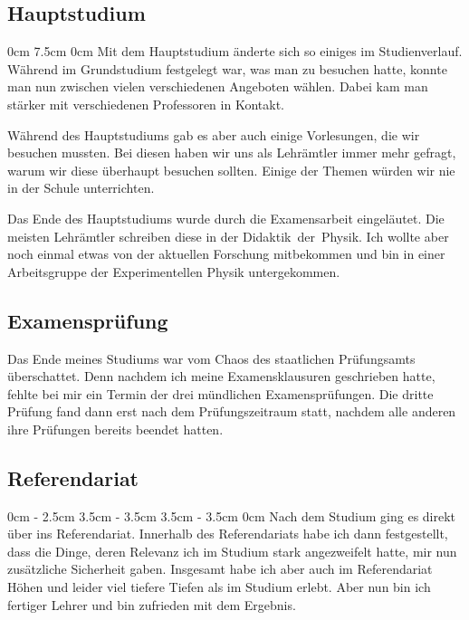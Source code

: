 \begin{multicols*}{2}

\subsection*{Hauptstudium}
0cm 7.5cm
0cm \columnwidth
Mit dem Hauptstudium änderte sich so einiges im Studienverlauf. Während im Grundstudium festgelegt war, was man zu besuchen hatte, konnte man nun zwischen vielen verschiedenen Angeboten wählen. Dabei kam man stärker mit verschiedenen Professoren in Kontakt.

Während des Hauptstudiums gab es aber auch einige Vorlesungen, die wir besuchen mussten. Bei diesen haben wir uns als Lehrämtler immer mehr gefragt, warum wir diese überhaupt besuchen sollten. Einige der Themen würden wir nie in der Schule unterrichten.

Das Ende des Hauptstudiums wurde durch die Examensarbeit eingeläutet. Die meisten Lehrämtler schreiben diese in der Didaktik~der~Physik. Ich wollte aber noch einmal etwas von der aktuellen Forschung mitbekommen und bin in einer Arbeitsgruppe der Experimentellen Physik untergekommen.

\subsection*{Examensprüfung}
Das Ende meines Studiums war vom Chaos des staatlichen Prüfungsamts überschattet. Denn nachdem ich meine Examensklausuren geschrieben hatte, fehlte bei mir ein Termin der drei mündlichen Examensprüfungen. Die dritte Prüfung fand dann erst nach dem Prüfungszeitraum statt, nachdem alle anderen ihre Prüfungen bereits beendet hatten.

\subsection*{Referendariat}
0cm \columnwidth
0cm \columnwidth
0cm \columnwidth
0cm \columnwidth
0cm \columnwidth
0cm \columnwidth
2.5cm \dimexpr\columnwidth - 2.5cm
3.5cm \dimexpr\columnwidth - 3.5cm
3.5cm \dimexpr\columnwidth - 3.5cm
0cm \columnwidth
Nach dem Studium ging es direkt über ins Referendariat. Innerhalb des Referendariats habe ich dann festgestellt, dass die Dinge, deren Relevanz ich im Studium stark angezweifelt hatte, mir nun zusätzliche Sicherheit gaben. Insgesamt habe ich aber auch im Referendariat Höhen und leider viel tiefere Tiefen als im Studium erlebt. Aber nun bin ich fertiger Lehrer und bin zufrieden mit dem Ergebnis.


\end{multicols*}
